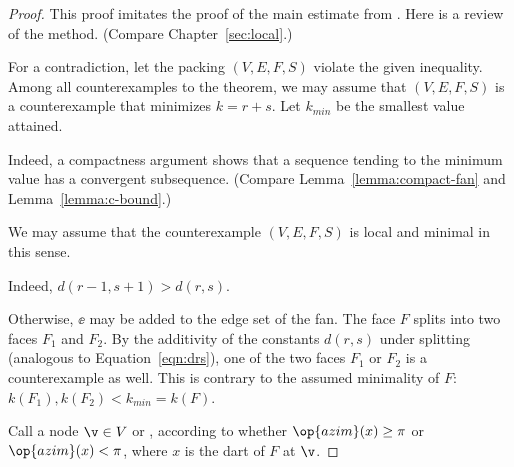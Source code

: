 \begin{proof} This proof imitates the proof of the main estimate from
  \cite{Hales:2006:DCG}.  Here is a review of the method.  (Compare
  Chapter~\ref{sec:local}.)

  For a contradiction, let the packing $(V,E,F,S)$ violate the given
  inequality.  Among all counterexamples to the theorem, we may assume
  that $(V,E,F,S)$ is a counterexample that minimizes $k=r+s$.  Let
  $k_{min}$ be the smallest value attained.



    Indeed, a compactness argument shows that a sequence
tending to the minimum value has a convergent subsequence.  (Compare
Lemma~\ref{lemma:compact-fan} and Lemma~\ref{lemma:c-bound}.)

We may assume that the counterexample $(V,E,F,S)$ is local and minimal
in this sense.

  Indeed, $d(r-1,s+1)>d(r,s)$.

  Otherwise, $\ee$ may be added to the edge
set of the fan.  The face $F$ splits into two faces $F_1$ and $F_2$.
By the additivity of the constants $d(r,s)$ under splitting (analogous
to Equation~\ref{eqn:drs}), one of the two faces $F_1$ or $F_2$ is a
counterexample as well.  This is contrary to the assumed minimality of
$F$: $k(F_1),k(F_2)<k_{min}=k(F)$.


Call a node $\v\in V$  or , according
to whether $\op{azim}(x)\ge\pi$ or $\op{azim}(x)<\pi$, where $x$ is
the dart of $F$ at $\v$.  %
%


\end{proof}
